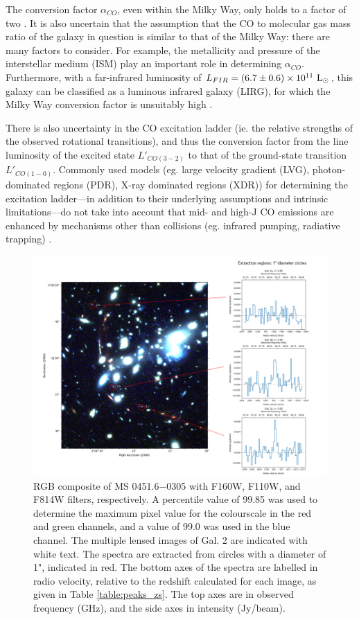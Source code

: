 \documentclass[11pt]{article}
\begin{document}
The conversion factor $\alpha_{CO}$, even within the Milky Way, only holds to a factor of two \citep{Carilli2013}. It is also uncertain that the assumption that the CO to molecular gas mass ratio of the galaxy in question is similar to that of the Milky Way: there are many factors to consider. For example, the metallicity and pressure of the interstellar medium (ISM) play an important role in determining $\alpha_{CO}$. Furthermore, with a far-infrared luminosity of $L_{FIR} = (6.7 \pm 0.6)\times 10^{11}~{\rm L_\odot}$, this galaxy can be classified as a luminous infrared galaxy (LIRG), for which the Milky Way conversion factor is unsuitably high \citep{Carilli2013}. 

There is also uncertainty in the CO excitation ladder (ie. the relative strengths of the observed rotational transitions), and thus the conversion factor from the line luminosity of the excited state $L'_{CO(3-2)}$ to that of the ground-state transition $L'_{CO(1-0)}$. Commonly used models (eg. large velocity gradient (LVG), photon-dominated regions (PDR), X-ray dominated regions (XDR)) for determining the excitation ladder---in addition to their underlying assumptions and intrinsic limitations---do not take into account that mid- and high-J CO emissions are enhanced by mechanisms other than collisions (eg. infrared pumping, radiative trapping) \citep{Carilli2013}. 

\begin{figure}[!htbp]
    \hspace{-1cm}
    \includegraphics[width=1.1\linewidth]{../figs/final.png}
	\caption{RGB composite of MS 0451.6−0305 with F160W, F110W, and F814W filters, respectively. A percentile value of 99.85 was used to determine the maximum pixel value for the colourscale in the red and green channels, and a value of 99.0 was used in the blue channel. The multiple lensed images of Gal. 2 are indicated with white text. The spectra are extracted from circles with a diameter of 1", indicated in red. The bottom axes of the spectra are labelled in radio velocity, relative to the redshift calculated for each image, as given in Table \ref{table:peaks_zs}. The top axes are in observed frequency (GHz), and the side axes in intensity (Jy/beam).}
    \label{fig:final_oteo}
\end{figure}
\end{document}
